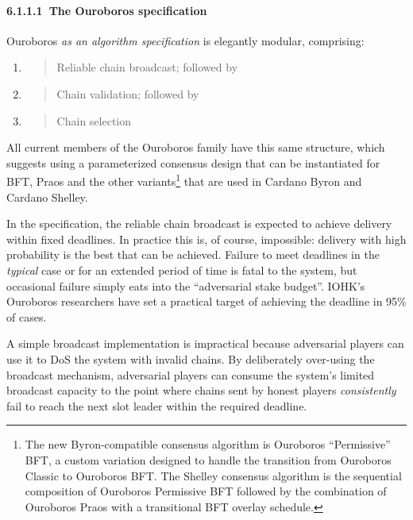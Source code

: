\documentclass[11pt,a4paper]{article}
\begin{document}
\hypertarget{the-ouroboros-specification}{%
\paragraph{​6.1.1.1​~The Ouroboros
specification}\label{the-ouroboros-specification}}

Ouroboros \emph{as an algorithm specification} is elegantly modular,
comprising:

\begin{enumerate}
\def\labelenumi{\arabic{enumi}.}
\item
  \begin{quote}
  Reliable chain broadcast; followed by
  \end{quote}
\item
  \begin{quote}
  Chain validation; followed by
  \end{quote}
\item
  \begin{quote}
  Chain selection
  \end{quote}
\end{enumerate}

All current members of the Ouroboros family have this same structure,
which suggests using a parameterized consensus design that can be
instantiated for BFT, Praos and the other variants\footnote{The new
  Byron-compatible consensus algorithm is Ouroboros ``Permissive'' BFT,
  a custom variation designed to handle the transition from Ouroboros
  Classic to Ouroboros BFT. The Shelley consensus algorithm is the
  sequential composition of Ouroboros Permissive BFT followed by the
  combination of Ouroboros Praos with a transitional BFT overlay
  schedule.} that are used in Cardano Byron and Cardano Shelley.

In the specification, the reliable chain broadcast is expected to
achieve delivery within fixed deadlines. In practice this is, of course,
impossible: delivery with high probability is the best that can be
achieved. Failure to meet deadlines in the \emph{typical} case or for an
extended period of time is fatal to the system, but occasional failure
simply eats into the ``adversarial stake budget''. IOHK's Ouroboros
researchers have set a practical target of achieving the deadline in
95\% of cases.

A simple broadcast implementation is impractical because adversarial
players can use it to DoS the system with invalid chains. By
deliberately over-using the broadcast mechanism, adversarial players can
consume the system's limited broadcast capacity to the point where
chains sent by honest players \emph{consistently} fail to reach the next
slot leader within the required deadline.
\end{document}
